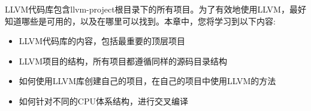 
LLVM代码库包含llvm-project根目录下的所有项目。为了有效地使用LLVM，最好知道哪些是可用的，以及在哪里可以找到。本章中，您将学习到以下内容:\par

\begin{itemize}
	\item LLVM代码库的内容，包括最重要的顶层项目
	\item LLVM项目的结构，所有项目都遵循同样的源码目录结构
	\item 如何使用LLVM库创建自己的项目，在自己的项目中使用LLVM的方法
	\item 如何针对不同的CPU体系结构，进行交叉编译
\end{itemize}


